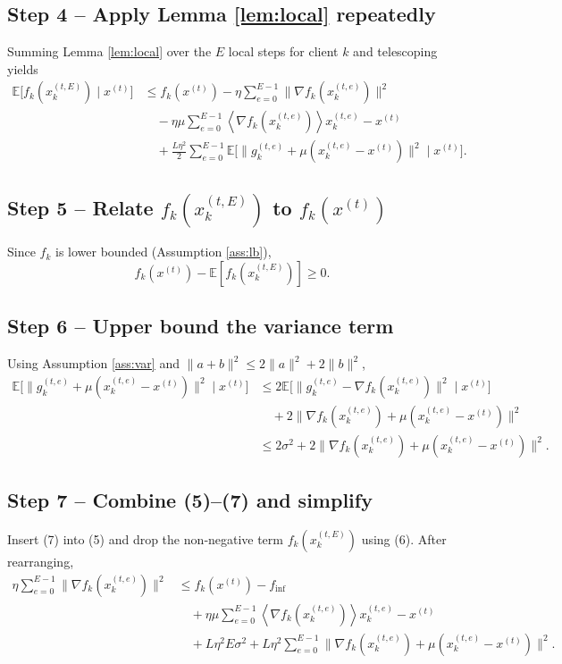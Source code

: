 \documentclass[11pt]{article}
\newcommand{\E}{\mathbb{E}}
\newcommand{\inner}[1]{\left\langle #1 \right\rangle}
\begin{document}
\subsection*{Step 4 – Apply Lemma \ref{lem:local} repeatedly}
Summing Lemma \ref{lem:local} over the $E$ local steps for client $k$ and telescoping yields
\[
\begin{aligned}
\E\bigl[f_k(x_{k}^{(t,E)})\mid x^{(t)}\bigr] 
&\le f_k(x^{(t)}) - \eta\sum_{e=0}^{E-1}\bigl\|\nabla f_k(x_{k}^{(t,e)})\bigr\|^{2} \\
&\quad -\eta\mu\sum_{e=0}^{E-1}\inner{\nabla f_k(x_{k}^{(t,e)})}{x_{k}^{(t,e)}-x^{(t)}} \\
&\quad +\frac{L\eta^{2}}{2}\sum_{e=0}^{E-1}\E\bigl[\|g_{k}^{(t,e)}+\mu(x_{k}^{(t,e)}-x^{(t)})\|^{2}\mid x^{(t)}\bigr].
\end{aligned}
\tag{5}
\]

\subsection*{Step 5 – Relate $f_k(x_{k}^{(t,E)})$ to $f_k(x^{(t)})$}
Since $f_k$ is lower bounded (Assumption \ref{ass:lb}),
\[
f_k(x^{(t)}) - \E[f_k(x_{k}^{(t,E)})]\ge 0.
\tag{6}
\]

\subsection*{Step 6 – Upper bound the variance term}
Using Assumption \ref{ass:var} and $\|a+b\|^{2}\le 2\|a\|^{2}+2\|b\|^{2}$,
\[
\begin{aligned}
\E\bigl[\|g_{k}^{(t,e)}+\mu(x_{k}^{(t,e)}-x^{(t)})\|^{2}\mid x^{(t)}\bigr] 
&\le 2\E\bigl[\|g_{k}^{(t,e)}-\nabla f_k(x_{k}^{(t,e)})\|^{2}\mid x^{(t)}\bigr] \\
&\quad +2\bigl\|\nabla f_k(x_{k}^{(t,e)})+\mu(x_{k}^{(t,e)}-x^{(t)})\bigr\|^{2}\\
&\le 2\sigma^{2}+2\bigl\|\nabla f_k(x_{k}^{(t,e)})+\mu(x_{k}^{(t,e)}-x^{(t)})\bigr\|^{2}.
\end{aligned}
\tag{7}
\]

\subsection*{Step 7 – Combine (5)–(7) and simplify}
Insert (7) into (5) and drop the non‑negative term $f_k(x_{k}^{(t,E)})$ using (6). After rearranging,
\[
\begin{aligned}
\eta\sum_{e=0}^{E-1}\bigl\|\nabla f_k(x_{k}^{(t,e)})\bigr\|^{2}
&\le f_k(x^{(t)})-f_{\inf} \\
&\quad + \eta\mu\sum_{e=0}^{E-1}\inner{\nabla f_k(x_{k}^{(t,e)})}{x_{k}^{(t,e)}-x^{(t)}} \\
&\quad + L\eta^{2}E\sigma^{2} + L\eta^{2}\sum_{e=0}^{E-1}\bigl\|\nabla f_k(x_{k}^{(t,e)})+\mu(x_{k}^{(t,e)}-x^{(t)})\bigr\|^{2}.
\end{aligned}
\tag{8}
\]
\end{document}
